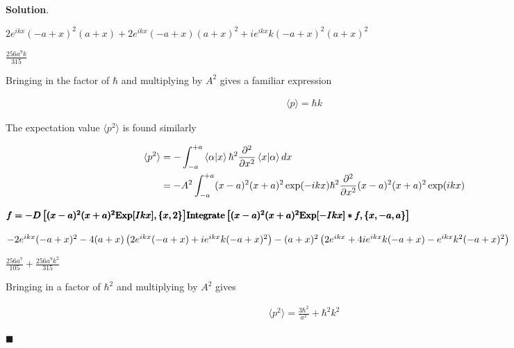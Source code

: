 \documentclass[12pt]{article}
\theoremstyle{definition}
\newenvironment{s}{%
        \begin{trivlist} \item \textbf{Solution}. }{%
            \hspace*{\fill} $\blacksquare$\end{trivlist}}%
\begin{document}
{\begin{s}
\begin{doublespace}
\noindent\(2 e^{i k x} (-a+x)^2 (a+x)+2 e^{i k x} (-a+x) (a+x)^2+i e^{i k x} k (-a+x)^2 (a+x)^2\)
\end{doublespace}

\begin{doublespace}
\noindent\(\frac{256 a^9 k}{315}\)
\end{doublespace}

Bringing in the factor of $\hbar$ and multiplying by $A^{2}$ gives a familiar expression


\begin{align*}
\langle p \rangle = \hbar k
\end{align*}

The expectation value $\langle p^{2}\rangle$ is found similarly

\begin{align*}
\langle p^{2} \rangle &= -\int_{-a}^{+a} \bra{\alpha}\ket{x}\hbar^{2}\frac{\partial^{2}}{\partial x^{2}}\bra{x}\ket{\alpha}dx\\
&= -A^{2}\int_{-a}^{+a}(x-a)^{2}(x+a)^{2}\exp(-ikx)\hbar^{2}\frac{\partial^{2}}{\partial x^{2}}(x-a)^{2}(x+a)^{2}\exp(ikx)
\end{align*}

\begin{doublespace}
\noindent\(\pmb{\text{}}\\
\pmb{f = -D\left[(x-a)^2 (x+a)^2 \text{Exp}[I k x],\{x,2\}\right]}\\
\pmb{\text{Integrate}\left[(x-a)^2 (x+a)^2 \text{Exp}[-I k x]* f,\{x,-a,a\}\right]}\)
\end{doublespace}

\begin{doublespace}
\noindent\(-2 e^{i k x} (-a+x)^2-4 (a+x) \left(2 e^{i k x} (-a+x)+i e^{i k x} k (-a+x)^2\right)-\\(a+x)^2 \left(2 e^{i k x}+4 i e^{i k x} k (-a+x)-e^{i
k x} k^2 (-a+x)^2\right)\)
\end{doublespace}

\begin{doublespace}
\noindent\(\frac{256 a^7}{105}+\frac{256 a^9 k^2}{315}\)
\end{doublespace}

Bringing in a factor of $\hbar^{2}$ and multiplying by $A^{2}$ gives


\begin{align*}
\langle p^{2} \rangle = \frac{3\hbar^{2}}{a^{2}} + \hbar^{2}k^{2}
\end{align*}


\end{s}}
\end{document}
